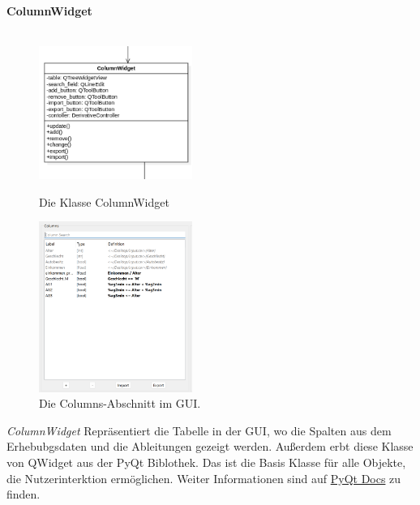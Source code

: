 \documentclass{article}
\begin{document}
\newpage
\textbf{\large{ColumnWidget}}\\\\
\begin{figure}[H]%
    \centering
    \begin{minipage}[b]{0.4\textwidth}
        \includegraphics[width=5cm]{entwurf/Entwurf_dokument/img/Alissa/ColumnWidget.png}
        \caption{Die Klasse ColumnWidget}
    \end{minipage}
    \hfill
    \begin{minipage}[b]{0.4\textwidth}
        \includegraphics[width=5cm]{entwurf/Entwurf_dokument/img/Alissa/Columns.png} 
    \caption{Die Columns-Abschnitt im GUI.}
    \end{minipage}
\end{figure}
\textit{ColumnWidget} Repräsentiert die Tabelle in der GUI, wo die Spalten aus dem Erhebubgsdaten und die Ableitungen gezeigt werden. Außerdem erbt diese Klasse von QWidget aus der PyQt Biblothek.  Das ist die Basis Klasse für alle Objekte, die Nutzerinterktion ermöglichen. Weiter Informationen sind auf \href{https://doc.qt.io/qt-6/qwidget.html}{PyQt Docs} zu finden.
\newline \newline
\end{document}
